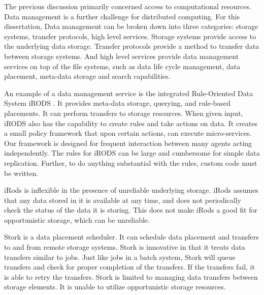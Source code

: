 
The previous discussion primarily concerned access to computational resources.  Data management is a further challenge for distributed computing.  For this dissertation, Data management can be broken down into three categories: storage systems, transfer protocols, high level services.  Storage systems provide access to the underlying data storage.  Transfer protocols provide a method to transfer data between storage systems.  And high level services provide data management services on top of the file systems, such as data life cycle management, data placement, meta-data storage and search capabilities.

An example of a data management service is the integrated Rule-Oriented Data System iRODS \cite{rajasekar2010irods}.  It provides meta-data storage, querying, and rule-based placements.  It can perform transfers to storage resources.  When given input, iRODS also has the capability to create rules and take actions on data.  It creates a small policy framework that upon certain actions, can execute micro-services.  Our framework is designed for frequent interaction between many agents acting independently.  The rules for iRODS can be large and cumbersome for simple data replication.  Further, to do anything substantial with the rules, custom code must be written.

iRods is inflexible in the presence of unreliable underlying storage.  iRods assumes that any data stored in it is available at any time, and does not periodically check the status of the data it is storing.  This does not make iRods a good fit for opportunistic storage, which can be unreliable.  

Stork \cite{kosar2004stork} is a data placement scheduler.  It can schedule data placement and transfers to and from remote storage systems.  Stork is innovative in that it treats data transfers similar to jobs.  Just like jobs in a batch system, Stork will queue transfers and check for proper completion of the transfers.  If the transfers fail, it is able to retry the transfers.  Stork is limited to managing data transfers between storage elements.  It is unable to utilize opportunistic storage resources.

